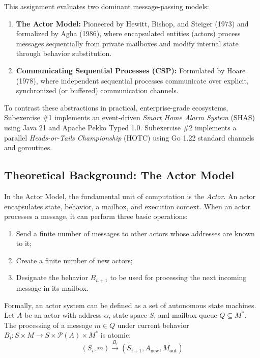\documentclass[11pt,a4paper]{article}
\begin{document}
This assignment evaluates two dominant message-passing models:
\begin{enumerate}[leftmargin=*]
    \item \textbf{The Actor Model:} Pioneered by Hewitt, Bishop, and Steiger (1973) and formalized by Agha (1986), where encapsulated entities (actors) process messages sequentially from private mailboxes and modify internal state through behavior substitution.
    \item \textbf{Communicating Sequential Processes (CSP):} Formulated by Hoare (1978), where independent sequential processes communicate over explicit, synchronized (or buffered) communication channels.
\end{enumerate}

To contrast these abstractions in practical, enterprise-grade ecosystems, Subexercise \#1 implements an event-driven \emph{Smart Home Alarm System} (SHAS) using Java 21 and Apache Pekko Typed 1.0. Subexercise \#2 implements a parallel \emph{Heads-or-Tails Championship} (HOTC) using Go 1.22 standard channels and goroutines.

\subsection{Theoretical Background: The Actor Model}

In the Actor Model, the fundamental unit of computation is the \emph{Actor}. An actor encapsulates state, behavior, a mailbox, and execution context. When an actor processes a message, it can perform three basic operations:
\begin{enumerate}
    \item Send a finite number of messages to other actors whose addresses are known to it;
    \item Create a finite number of new actors;
    \item Designate the behavior $B_{n+1}$ to be used for processing the next incoming message in its mailbox.
\end{enumerate}

Formally, an actor system can be defined as a set of autonomous state machines. Let $A$ be an actor with address $\alpha$, state space $S$, and mailbox queue $Q \subseteq M^*$. The processing of a message $m \in Q$ under current behavior $B_i: S \times M \to S \times \mathcal{P}(A) \times M^*$ is atomic:
\begin{equation}
(S_i, m) \xrightarrow{B_i} (S_{i+1}, A_{\text{new}}, M_{\text{out}})
\end{equation}
\end{document}
